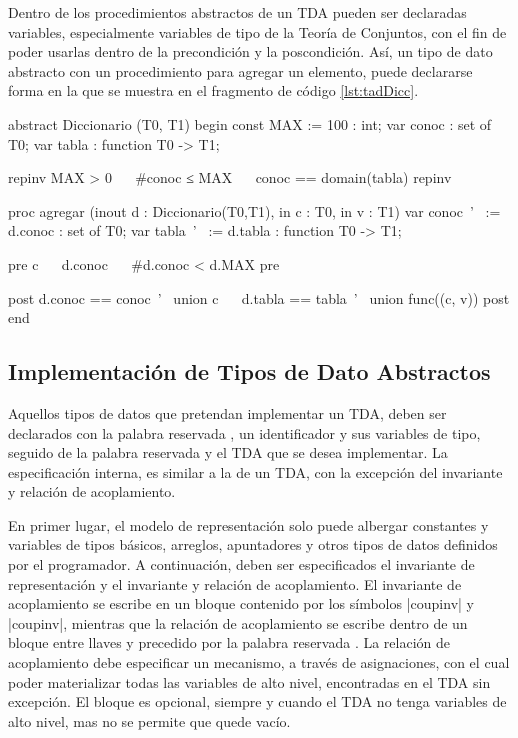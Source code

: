 Dentro de los procedimientos abstractos de un TDA pueden ser declaradas
variables, especialmente variables de tipo de la Teoría de Conjuntos, con el
fin de poder usarlas dentro de la precondición y la poscondición. Así, un tipo
de dato abstracto  con un procedimiento para agregar un
elemento, puede declararse forma en la que se muestra en el fragmento de código
\ref{lst:tadDicc}.

\begin{widegracielacode}[caption=TAD Diccionario, label=lst:tadDicc]
abstract Diccionario (T0, T1) begin
  const MAX := 100 : int;
  var   conoc      : set of T0;
  var   tabla      : function T0 -> T1;

  {repinv MAX > 0 ~\Land~ #conoc ≤ MAX ~\Land~ conoc == domain(tabla) repinv}

  proc agregar (inout d : Diccionario(T0,T1), in c : T0, in v : T1)
    var conoc~'~ := d.conoc : set of T0;
    var tabla~'~ := d.tabla : function T0 -> T1;

    {pre c ~\Notelem~ d.conoc ~\Land~ #d.conoc < d.MAX pre}

    {post  d.conoc == conoc~'~ union {c}
         ~\Land~ d.tabla == tabla~'~ union func({(c, v)}) post}
end
\end{widegracielacode}

\subsection{Implementación de Tipos de Dato Abstractos}

Aquellos tipos de datos que pretendan implementar un TDA, deben ser declarados
con la palabra reservada , un identificador y sus variables de
tipo, seguido de la palabra reservada  y el TDA que se
desea implementar. La especificación interna, es similar a la de un TDA, con la
excepción del invariante y relación de acoplamiento.

En primer lugar, el modelo de representación solo puede albergar constantes y
variables de tipos básicos, arreglos, apuntadores y otros tipos de datos
definidos por el programador. A continuación, deben ser especificados el
invariante de representación y el invariante y relación de acoplamiento. El
invariante de acoplamiento se escribe en un bloque contenido por los símbolos
\ingra|{coupinv| y \ingra|coupinv}|, mientras que la relación de
acoplamiento se escribe dentro de un bloque entre llaves y precedido por la
palabra reservada . La relación de acoplamiento debe especificar
un mecanismo, a través de asignaciones, con el cual poder materializar todas
las variables de alto nivel, encontradas en el TDA sin excepción. El bloque
 es opcional, siempre y cuando el TDA no tenga variables de alto
nivel, mas no se permite que quede vacío.


